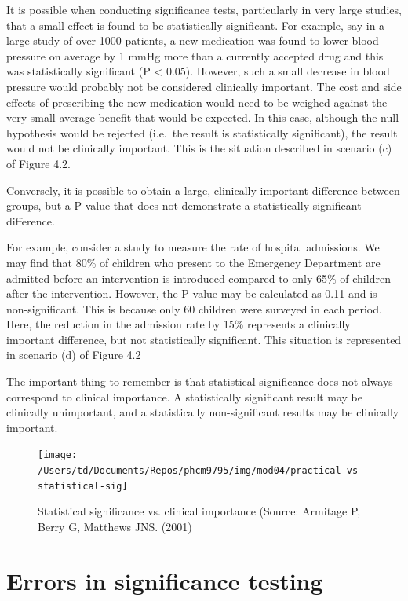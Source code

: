 \documentclass[
]{memoir}
\begin{document}
It is possible when conducting significance tests, particularly in very large studies, that a small effect is found to be statistically significant. For example, say in a large study of over 1000 patients, a new medication was found to lower blood pressure on average by 1 mmHg more than a currently accepted drug and this was statistically significant (P \textless{} 0.05). However, such a small decrease in blood pressure would probably not be considered clinically important. The cost and side effects of prescribing the new medication would need to be weighed against the very small average benefit that would be expected. In this case, although the null hypothesis would be rejected (i.e.~the result is statistically significant), the result would not be clinically important. This is the situation described in scenario (c) of Figure 4.2.

Conversely, it is possible to obtain a large, clinically important difference between groups, but a P value that does not demonstrate a statistically significant difference.

For example, consider a study to measure the rate of hospital admissions. We may find that 80\% of children who present to the Emergency Department are admitted before an intervention is introduced compared to only 65\% of children after the intervention. However, the P value may be calculated as 0.11 and is non-significant. This is because only 60 children were surveyed in each period. Here, the reduction in the admission rate by 15\% represents a clinically important difference, but not statistically significant. This situation is represented in scenario (d) of Figure 4.2

The important thing to remember is that statistical significance does not always correspond to clinical importance. A statistically significant result may be clinically unimportant, and a statistically non-significant results may be clinically important.

\begin{figure}
\texttt{[image: /Users/td/Documents/Repos/phcm9795/img/mod04/practical-vs-statistical-sig]} \caption{Statistical significance vs. clinical importance (Source: Armitage P, Berry G, Matthews JNS. (2001)}\label{fig:practical-importance}
\end{figure}

\hypertarget{errors-in-significance-testing}{%
\section{Errors in significance testing}\label{errors-in-significance-testing}}
\end{document}
